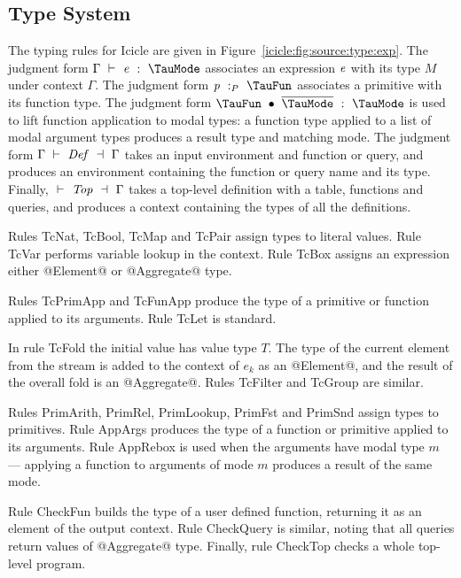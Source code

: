 \subsection{Type System}
\label{icicle:s:ElementsAndAggregates:TypeSystem}
The typing rules for Icicle are given in Figure~\ref{icicle:fig:source:type:exp}.
The judgment form $\Typecheck{\Gamma}{\mi{e}}{\TauMode}$ associates an expression $\mathit{e}$ with its type $M$ under context $\Gamma$.
The judgment form $\TypecheckP{\mi{p}}{\TauFun}$ associates a primitive with its function type.
The judgment form $\TypecheckApp{\TauFun}{\ov{\TauMode}}{\TauMode}$ is used to lift function application to modal types: a function type applied to a list of modal argument types produces a result type and matching mode.
The judgment form $\TypecheckS{\Gamma}{\mi{Def}}{\Gamma}$ takes an input environment and function or query, and produces an environment containing the function or query name and its type.
Finally, $\TypecheckS{}{\mi{Top}}{\Gamma}$ takes a top-level definition with a table, functions and queries, and produces a context containing the types of all the definitions.

Rules TcNat, TcBool, TcMap and TcPair assign types to literal values.
Rule TcVar performs variable lookup in the context.
Rule TcBox assigns an expression either @Element@ or @Aggregate@ type. 

Rules TcPrimApp and TcFunApp produce the type of a primitive or function applied to its arguments. Rule TcLet is standard.

In rule TcFold the initial value has value type $T$. The type of the current element from the stream is added to the context of $e_k$ as an @Element@, and the result of the overall fold is an @Aggregate@. Rules TcFilter and TcGroup are similar.

Rules PrimArith, PrimRel, PrimLookup, PrimFst and \mbox{PrimSnd} assign types to primitives.
Rule AppArgs produces the type of a function or primitive applied to its arguments.
Rule AppRebox is used when the arguments have modal type $m$ --- applying a function to arguments of mode $m$ produces a result of the same mode.

Rule CheckFun builds the type of a user defined function, returning it as an element of the output context. Rule CheckQuery is similar, noting that all queries return values of @Aggregate@ type. Finally, rule CheckTop checks a whole top-level program.


